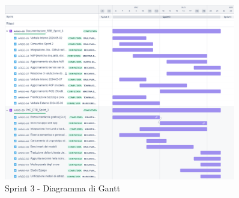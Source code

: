 \begin{figure}[H]
  \centering
  \includegraphics[width=0.90\textwidth]{assets/Pianificazione/Sprint-3/gantt.png}
  \caption{Sprint 3 - Diagramma di Gantt}\label{fig:sprint-3-gantt}
\end{figure}

